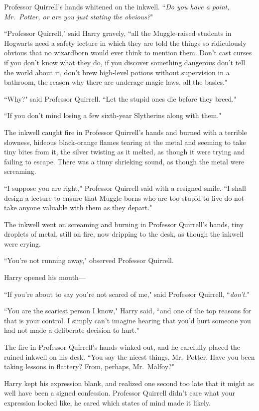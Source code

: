 Professor Quirrell's hands whitened on the inkwell. ``\emph{Do you have a point, Mr.~Potter, or are you just stating the obvious?}"

``Professor Quirrell," said Harry gravely, ``all the Muggle-raised students in Hogwarts need a safety lecture in which they are told the things so ridiculously obvious that no wizardborn would ever think to mention them. Don't cast curses if you don't know what they do, if you discover something dangerous don't tell the world about it, don't brew high-level potions without supervision in a bathroom, the reason why there are underage magic laws, all the basics."

``Why?" said Professor Quirrell. ``Let the stupid ones die before they breed."

``If you don't mind losing a few sixth-year Slytherins along with them."

The inkwell caught fire in Professor Quirrell's hands and burned with a terrible slowness, hideous black-orange flames tearing at the metal and seeming to take tiny bites from it, the silver twisting as it melted, as though it were trying and failing to escape. There was a tinny shrieking sound, as though the metal were screaming.

``I suppose you are right," Professor Quirrell said with a resigned smile. ``I shall design a lecture to ensure that Muggle-borns who are too stupid to live do not take anyone valuable with them as they depart."

The inkwell went on screaming and burning in Professor Quirrell's hands, tiny droplets of metal, still on fire, now dripping to the desk, as though the inkwell were crying.

``You're not running away," observed Professor Quirrell.

Harry opened his mouth—

``If you're about to say you're not scared of me," said Professor Quirrell, ``\emph{don't.}"

``You are the scariest person I know," Harry said, ``and one of the top reasons for that is your control. I simply can't imagine hearing that you'd hurt someone you had not made a deliberate decision to hurt."

The fire in Professor Quirrell's hands winked out, and he carefully placed the ruined inkwell on his desk. ``You say the nicest things, Mr.~Potter. Have you been taking lessons in flattery? From, perhaps, Mr.~Malfoy?"

Harry kept his expression blank, and realized one second too late that it might as well have been a signed confession. Professor Quirrell didn't care what your expression looked like, he cared which states of mind made it likely.

